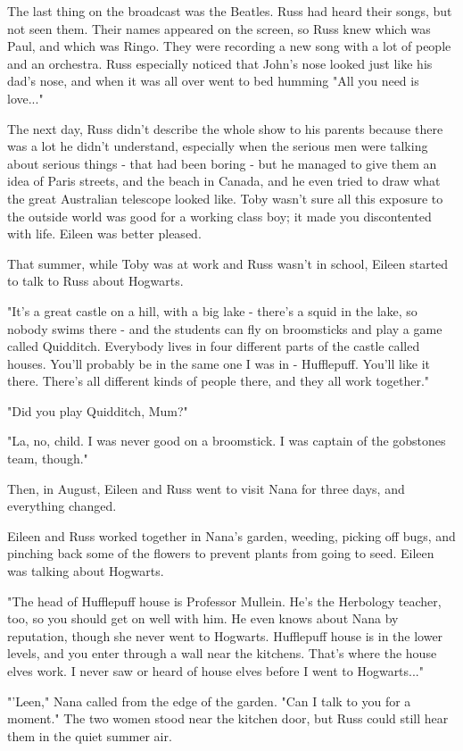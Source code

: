 \documentclass[a4paper,11pt]{article}
\begin{document}
The last thing on the broadcast was the Beatles. Russ had heard their songs, but not seen them. Their names appeared on the screen, so Russ knew which was Paul, and which was Ringo. They were recording a new song with a lot of people and an orchestra. Russ especially noticed that John's nose looked just like his dad's nose, and when it was all over went to bed humming "All you need is love..."

The next day, Russ didn't describe the whole show to his parents because there was a lot he didn't understand, especially when the serious men were talking about serious things - that had been boring - but he managed to give them an idea of Paris streets, and the beach in Canada, and he even tried to draw what the great Australian telescope looked like. Toby wasn't sure all this exposure to the outside world was good for a working class boy; it made you discontented with life. Eileen was better pleased.

That summer, while Toby was at work and Russ wasn't in school, Eileen started to talk to Russ about Hogwarts.

"It's a great castle on a hill, with a big lake - there's a squid in the lake, so nobody swims there - and the students can fly on broomsticks and play a game called Quidditch. Everybody lives in four different parts of the castle called houses. You'll probably be in the same one I was in - Hufflepuff. You'll like it there. There's all different kinds of people there, and they all work together."

"Did you play Quidditch, Mum?"

"La, no, child. I was never good on a broomstick. I was captain of the gobstones team, though."

Then, in August, Eileen and Russ went to visit Nana for three days, and everything changed.

Eileen and Russ worked together in Nana's garden, weeding, picking off bugs, and pinching back some of the flowers to prevent plants from going to seed. Eileen was talking about Hogwarts.

"The head of Hufflepuff house is Professor Mullein. He's the Herbology teacher, too, so you should get on well with him. He even knows about Nana by reputation, though she never went to Hogwarts. Hufflepuff house is in the lower levels, and you enter through a wall near the kitchens. That's where the house elves work. I never saw or heard of house elves before I went to Hogwarts..."

"'Leen," Nana called from the edge of the garden. "Can I talk to you for a moment." The two women stood near the kitchen door, but Russ could still hear them in the quiet summer air.
\end{document}
